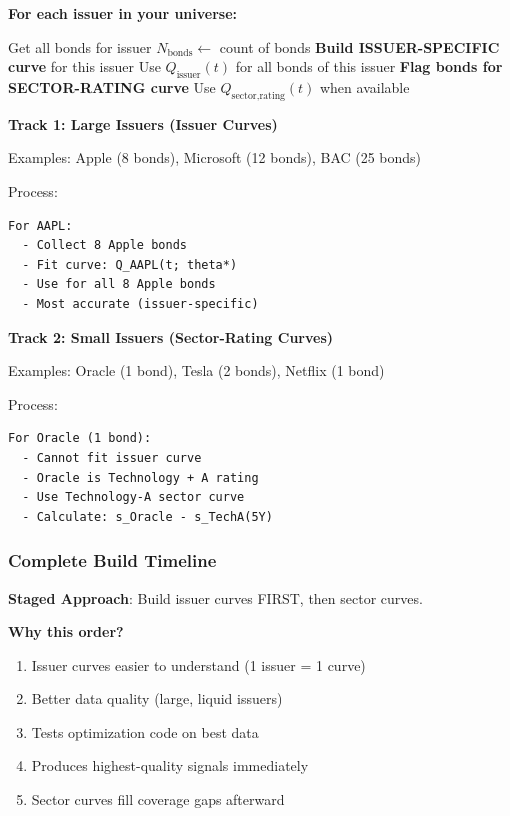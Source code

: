 \documentclass[11pt,a4paper]{article}
\begin{document}
\begin{implbox}
\textbf{For each issuer in your universe:}

\begin{algorithm}[H]
\caption{Curve Selection Logic}
\begin{algorithmic}[1]
\STATE Get all bonds for issuer
\STATE $N_{\text{bonds}} \gets $ count of bonds
    \STATE \textbf{Build ISSUER-SPECIFIC curve} for this issuer
    \STATE Use $Q_{\text{issuer}}(t)$ for all bonds of this issuer
\ELSE
    \STATE \textbf{Flag bonds for SECTOR-RATING curve}
    \STATE Use $Q_{\text{sector,rating}}(t)$ when available
\ENDIF
\end{algorithmic}
\end{algorithm}

\textbf{Track 1: Large Issuers (Issuer Curves)}

Examples: Apple (8 bonds), Microsoft (12 bonds), BAC (25 bonds)

Process:
\begin{lstlisting}
For AAPL:
  - Collect 8 Apple bonds
  - Fit curve: Q_AAPL(t; theta*)
  - Use for all 8 Apple bonds
  - Most accurate (issuer-specific)
\end{lstlisting}

\textbf{Track 2: Small Issuers (Sector-Rating Curves)}

Examples: Oracle (1 bond), Tesla (2 bonds), Netflix (1 bond)

Process:
\begin{lstlisting}
For Oracle (1 bond):
  - Cannot fit issuer curve
  - Oracle is Technology + A rating
  - Use Technology-A sector curve
  - Calculate: s_Oracle - s_TechA(5Y)
\end{lstlisting}
\end{implbox}

\subsubsection{Complete Build Timeline}

\begin{keybox}
\textbf{Staged Approach}: Build issuer curves FIRST, then sector curves.

\textbf{Why this order?}
\begin{enumerate}
    \item Issuer curves easier to understand (1 issuer = 1 curve)
    \item Better data quality (large, liquid issuers)
    \item Tests optimization code on best data
    \item Produces highest-quality signals immediately
    \item Sector curves fill coverage gaps afterward
\end{enumerate}
\end{keybox}
\end{document}
